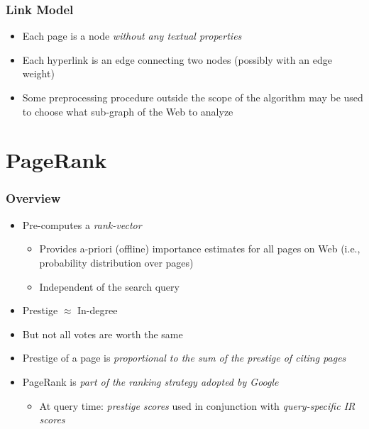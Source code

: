 \documentclass{beamer}
\begin{document}

\begin{frame}
  \frametitle{Link Model}

  \begin{itemize}
  \item Each page is a node \emph{without any textual properties}
  \item Each hyperlink is an edge connecting two nodes (possibly with an edge
      weight)
  \item Some preprocessing procedure outside the scope of the algorithm may be
      used to choose what sub-graph of the Web to analyze
  \end{itemize}

\end{frame}


\section{PageRank}

\begin{frame}
  \frametitle{Overview}

  \begin{itemize}
  \item Pre-computes a \emph{rank-vector}
      \begin{itemize}
      \item Provides a-priori (offline) importance estimates for all pages on Web (i.e., probability distribution over pages)
      \item Independent of the search query
      \end{itemize}
  \item Prestige $\approx$ In-degree
  \item But not all votes are worth the same
  \item Prestige of a page is \emph{proportional to the sum of the prestige of
        citing pages}
  \item PageRank is \emph{part of the ranking strategy adopted by Google}
      \begin{itemize}
      \item At query time: \emph{prestige scores} used in conjunction with
          \emph{query-specific IR scores}
      \end{itemize}
  \end{itemize}

\end{frame}
\end{document}
